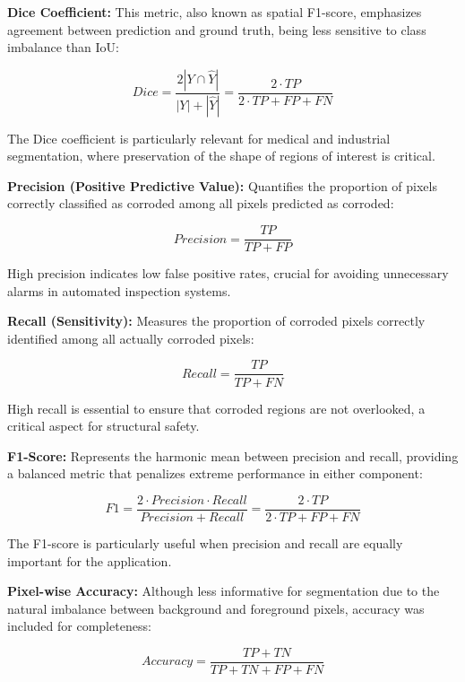 \documentclass[12pt,a4paper,twoside]{article}
\begin{document}
\textbf{Dice Coefficient:} This metric, also known as spatial F1-score, emphasizes agreement between prediction and ground truth, being less sensitive to class imbalance than IoU:

\begin{equation}
Dice = \frac{2|Y \cap \hat{Y}|}{|Y| + |\hat{Y}|} = \frac{2 \cdot TP}{2 \cdot TP + FP + FN}
\end{equation}

The Dice coefficient is particularly relevant for medical and industrial segmentation, where preservation of the shape of regions of interest is critical.

\textbf{Precision (Positive Predictive Value):} Quantifies the proportion of pixels correctly classified as corroded among all pixels predicted as corroded:

\begin{equation}
Precision = \frac{TP}{TP + FP}
\end{equation}

High precision indicates low false positive rates, crucial for avoiding unnecessary alarms in automated inspection systems.

\textbf{Recall (Sensitivity):} Measures the proportion of corroded pixels correctly identified among all actually corroded pixels:

\begin{equation}
Recall = \frac{TP}{TP + FN}
\end{equation}

High recall is essential to ensure that corroded regions are not overlooked, a critical aspect for structural safety.

\textbf{F1-Score:} Represents the harmonic mean between precision and recall, providing a balanced metric that penalizes extreme performance in either component:

\begin{equation}
F1 = \frac{2 \cdot Precision \cdot Recall}{Precision + Recall} = \frac{2 \cdot TP}{2 \cdot TP + FP + FN}
\end{equation}

The F1-score is particularly useful when precision and recall are equally important for the application.

\textbf{Pixel-wise Accuracy:} Although less informative for segmentation due to the natural imbalance between background and foreground pixels, accuracy was included for completeness:

\begin{equation}
Accuracy = \frac{TP + TN}{TP + TN + FP + FN}
\end{equation}
\end{document}
